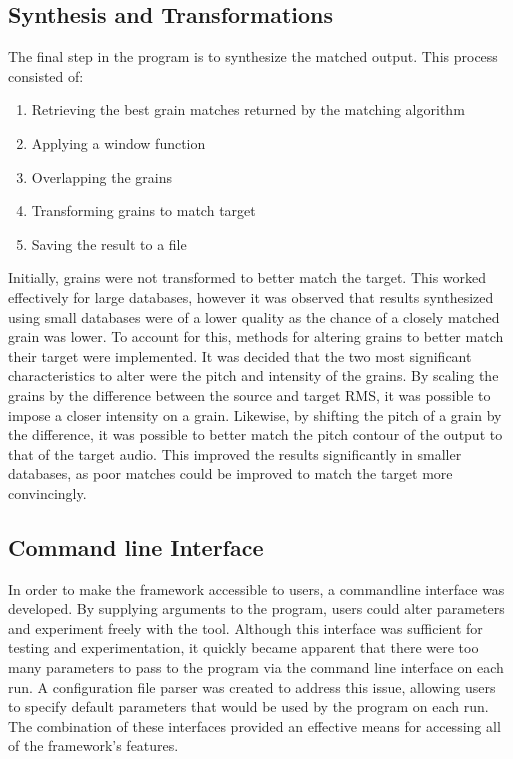 \documentclass{scrartcl}
\begin{document}
    \subsection*{Synthesis and Transformations}
    The final step in the program is to synthesize the matched output.
    This process consisted of:
    \begin{enumerate}
        \item Retrieving the best grain matches returned by the matching algorithm
        \item Applying a window function
        \item Overlapping the grains 
        \item Transforming grains to match target
        \item Saving the result to a file
    \end{enumerate}
    Initially, grains were not transformed to better match the target.  This
    worked effectively for large databases, however it was observed that
    results synthesized using small databases were of a lower quality as the
    chance of a closely matched grain was lower. To account for this, methods
    for altering grains to better match their target were implemented.  It was
    decided that the two most significant characteristics to alter were the
    pitch and intensity of the grains.  By scaling the grains by the difference
    between the source and target RMS, it was possible to impose a closer
    intensity on a grain. Likewise, by shifting the pitch of a grain by the
    difference, it was possible to better match the pitch contour of the output
    to that of the target audio.  This improved the results significantly in
    smaller databases, as poor matches could be improved to match the target
    more convincingly.

    \subsection*{Command line Interface}
    In order to make the framework accessible to users, a commandline interface
    was developed. By supplying arguments to the program, users could alter
    parameters and experiment freely with the tool.  Although this interface
    was sufficient for testing and experimentation, it quickly became apparent
    that there were too many parameters to pass to the program via the command
    line interface on each run. A configuration file parser was created to
    address this issue, allowing users to specify default parameters that would
    be used by the program on each run. The combination of these interfaces
    provided an effective means for accessing all of the framework's features.
\end{document}
